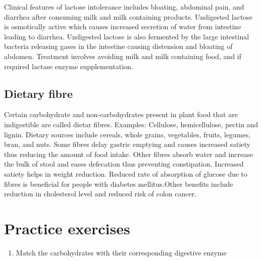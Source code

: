 \documentclass[
]{book}
\providecommand{\tightlist}{%
  \setlength{\itemsep}{0pt}\setlength{\parskip}{0pt}}
\begin{document}
Clinical features of lactose intolerance includes bloating, abdominal pain, and diarrhea after consuming milk and milk containing products. Undigested lactose is osmotically active which causes increased secretion of water from intestine leading to diarrhea. Undigested lactose is also fermented by the large intestinal bacteria releasing gases in the intestine causing distension and bloating of abdomen. Treatment involves avoiding milk and milk containing food, and if required lactase enzyme supplementation.

\subsection{Dietary fibre}\label{dietary-fibre}

Certain carbohydrate and non-carbohydrates present in plant food that are indigestible are called dietar fibres. Examples: Cellulose, hemicellulose, pectin and lignin. Dietary sources include cereals, whole grains, vegetables, fruits, legumes, bran, and nuts. Some fibres delay gastric emptying and causes increased satiety thus reducing the amount of food intake. Other fibres absorb water and increase the bulk of stool and eases defecation thus preventing constipation. Increased satiety helps in weight reduction. Reduced rate of absorption of glucose due to fibres is beneficial for people with diabetes mellitus.Other benefits include reduction in cholesterol level and reduced risk of colon cancer.

\section{Practice exercises}\label{practice-exercises}

\begin{enumerate}
\def\labelenumi{\arabic{enumi}.}
\tightlist
\item
  Match the carbohydrates with their corresponding digestive enzyme
\end{enumerate}
\end{document}
